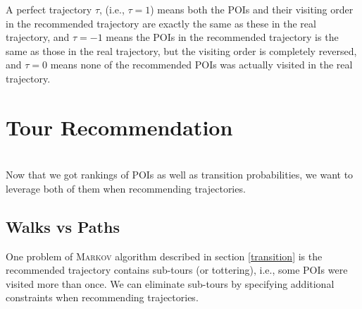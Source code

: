 A perfect trajectory $\tau$, (i.e., $\tau = 1$) means both the POIs and their visiting order in the 
recommended trajectory are exactly the same as these in the real trajectory,
and $\tau = -1$ means the POIs in the recommended trajectory is the same as those in the real trajectory,
but the visiting order is completely reversed,
and $\tau = 0$ means none of the recommended POIs was actually visited in the real trajectory.


\section{Tour Recommendation}
\label{recommendation}

 \\
Now that we got rankings of POIs as well as transition probabilities,
we want to leverage both of them when recommending trajectories.

\subsection{Walks vs Paths}
\label{walkpath}
%
One problem of \textsc{Markov} algorithm described in section \ref{transition} is the recommended 
trajectory contains sub-tours (or tottering), i.e., some POIs were visited more than once.
We can eliminate sub-tours by specifying additional constraints when recommending trajectories.

